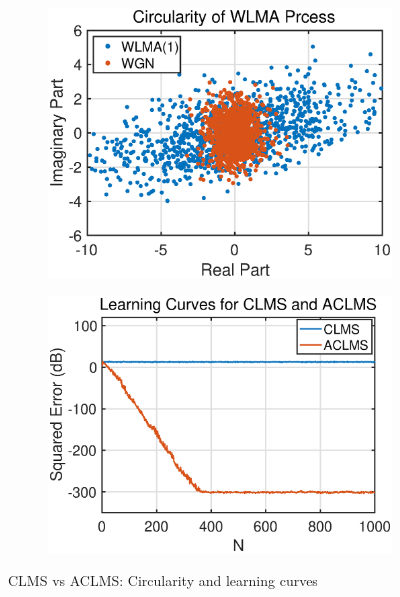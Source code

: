 \begin{figure}[htp]
    \centering
    \hspace{-0.4cm}
    \begin{subfigure}[b]{0.35\textwidth}
     \centering
     \includegraphics[width=1.2\textwidth]{fig/31/31a1.eps}
    \end{subfigure}
    \hspace{1.4cm}
    \begin{subfigure}[b]{0.35\textwidth}
     \centering
     \includegraphics[width=1.2\textwidth]{fig/31/31a2.eps}
    \end{subfigure}  
    \caption{CLMS vs ACLMS: Circularity and learning curves}
    \label{fig:3_1_a}
\end{figure}
